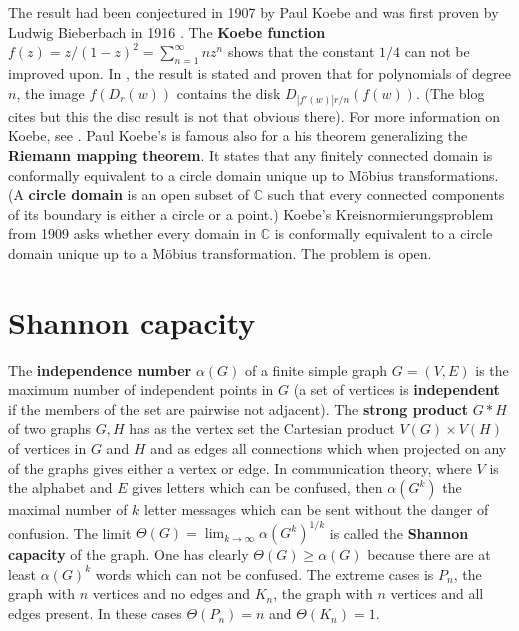 \documentclass[12pt]{amsart}
\begin{document}
The result had been conjectured in 1907 by Paul Koebe and was first proven by Ludwig Bieberbach
in 1916 \cite{Bieberbach1916}. The {\bf Koebe function} $f(z) = z/(1-z)^2 = \sum_{n=1}^{\infty} n z^n$
shows that the constant $1/4$ can not be improved upon.
In \cite{Tao11282020}, the result is stated and proven that for polynomials of degree $n$,
the image $f(D_r(w))$ contains the disk $D_{|f'(w)| r/n}(f(w))$. (The blog cites \cite{Miller1993} but
this the disc result is not that obvious there).
For more information on Koebe, see \cite{Carlson}.
Paul Koebe's is famous also for a his theorem generalizing
the {\bf Riemann mapping theorem}. It states that
any finitely connected domain is conformally equivalent to a circle domain unique up to
M\"obius transformations. (A {\bf circle domain} is an open subset of $\mathbb{C}$ such that every
connected components of its boundary is either a circle or a point.) Koebe's Kreisnormierungsproblem
from 1909 asks whether every domain in $\mathbb{C}$ is conformally equivalent to a circle domain
unique up to a M\"obius transformation. The problem is open.

\section{Shannon capacity}

The {\bf independence number} $\alpha(G)$ of a finite simple graph $G=(V,E)$
is the maximum number of independent points in $G$ (a set of vertices is 
{\bf independent} if the members of the set
are pairwise not adjacent). The
{\bf strong product} $G*H$ of two graphs $G,H$ has as the vertex set the Cartesian
product $V(G) \times V(H)$ of vertices in $G$ and $H$ and as edges all connections which when projected on
any of the graphs gives either a vertex or edge. In communication theory, where $V$ is
the alphabet and $E$ gives letters which can be confused, then
$\alpha(G^k)$ the maximal number of $k$ letter messages which can be sent without
the danger of confusion. The limit $\Theta(G) = \lim_{k \to \infty} \alpha(G^k)^{1/k}$ is called
the {\bf Shannon capacity} of the graph. One has clearly $\Theta(G) \geq \alpha(G)$ because there
are at least $\alpha(G)^k$ words which can not be confused. The extreme cases is $P_n$, the graph
with $n$ vertices and no edges and $K_n$, the graph with $n$ vertices and all edges present. In
these cases $\Theta(P_n)=n$ and $\Theta(K_n)=1$.
\end{document}
